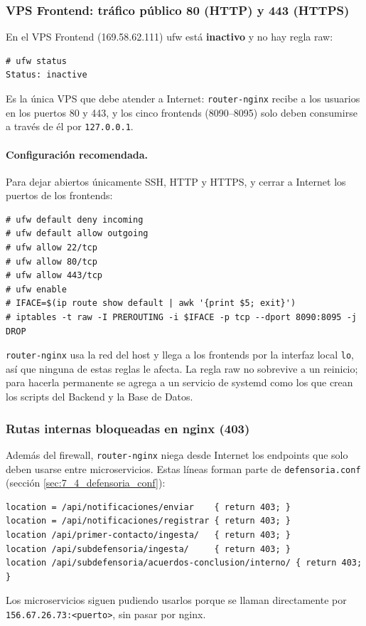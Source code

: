 \subsubsection{VPS Frontend: tráfico público 80 (HTTP) y 443 (HTTPS)}
En el VPS Frontend (169.58.62.111) ufw está \textbf{inactivo} y no hay regla raw:
\begin{lstlisting}
# ufw status
Status: inactive
\end{lstlisting}
Es la única VPS que debe atender a Internet: \texttt{router-nginx} recibe a los usuarios en los puertos 80 y 443, y los cinco frontends (8090--8095) solo deben consumirse a través de él por \texttt{127.0.0.1}.

\paragraph{Configuración recomendada.} Para dejar abiertos únicamente SSH, HTTP y HTTPS, y cerrar a Internet los puertos de los frontends:
\begin{lstlisting}
# ufw default deny incoming
# ufw default allow outgoing
# ufw allow 22/tcp
# ufw allow 80/tcp
# ufw allow 443/tcp
# ufw enable
# IFACE=$(ip route show default | awk '{print $5; exit}')
# iptables -t raw -I PREROUTING -i $IFACE -p tcp --dport 8090:8095 -j DROP
\end{lstlisting}
\texttt{router-nginx} usa la red del host y llega a los frontends por la interfaz local \texttt{lo}, así que ninguna de estas reglas le afecta. La regla raw no sobrevive a un reinicio; para hacerla permanente se agrega a un servicio de systemd como los que crean los scripts del Backend y la Base de Datos.

\subsubsection{Rutas internas bloqueadas en nginx (403)}
Además del firewall, \texttt{router-nginx} niega desde Internet los endpoints que solo deben usarse entre microservicios. Estas líneas forman parte de \texttt{defensoria.conf} (sección \ref{sec:7_4_defensoria_conf}):
\begin{lstlisting}
location = /api/notificaciones/enviar    { return 403; }
location = /api/notificaciones/registrar { return 403; }
location /api/primer-contacto/ingesta/   { return 403; }
location /api/subdefensoria/ingesta/     { return 403; }
location /api/subdefensoria/acuerdos-conclusion/interno/ { return 403; }
\end{lstlisting}
Los microservicios siguen pudiendo usarlos porque se llaman directamente por \texttt{156.67.26.73:<puerto>}, sin pasar por nginx.

